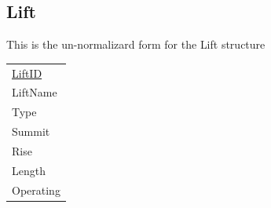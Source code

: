 \documentclass[12pt]{article}
\begin{document}
\subsection{Lift}
\vspace{0.4cm}
\par{This is the un-normalizard form for the Lift structure}
\newline \newline
{\setlength{\extrarowheight}{10pt}
\begin{tabular}{|p{2.5cm}|}
\hline
	\uline{LiftID}\\
	LiftName\\
	Type \\
	Summit\\
	Rise\\
	Length \\
	Operating\\
\hline
\end{tabular}} ~\\\\
\end{document}
